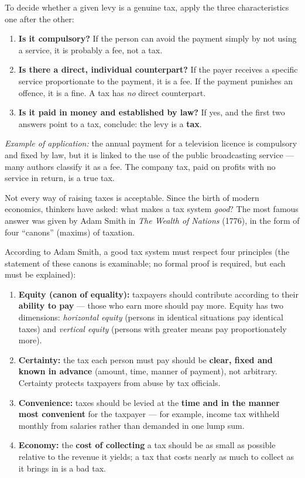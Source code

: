 \documentclass[11pt]{article}
\newcounter{popsec}
\newcounter{popsub}
\newcommand{\courssub}[1]{%
  \stepcounter{popsub}%
  \par\vspace{9pt}\noindent{\popxbold\fontsize{11.5}{13}\selectfont\color{popink}{\color{poporange}\thepopsec.\thepopsub}\hspace{6pt}#1}\par\nopagebreak\vspace{4pt}
}
\begin{document}
\begin{methode}
To decide whether a given levy is a genuine tax, apply the three characteristics one after the other:
\begin{enumerate}
\item \textbf{Is it compulsory?} If the person can avoid the payment simply by not using a service, it is probably a fee, not a tax.
\item \textbf{Is there a direct, individual counterpart?} If the payer receives a specific service proportionate to the payment, it is a fee. If the payment punishes an offence, it is a fine. A tax has \emph{no} direct counterpart.
\item \textbf{Is it paid in money and established by law?} If yes, and the first two answers point to a tax, conclude: the levy is a \textbf{tax}.
\end{enumerate}
\emph{Example of application:} the annual payment for a television licence is compulsory and fixed by law, but it is linked to the use of the public broadcasting service — many authors classify it as a fee. The company tax, paid on profits with no service in return, is a true tax.
\end{methode}

\courssub{The Principles of a Good Tax System}

Not every way of raising taxes is acceptable. Since the birth of modern economics, thinkers have asked: what makes a tax system \emph{good}? The most famous answer was given by Adam Smith in \emph{The Wealth of Nations} (1776), in the form of four ``canons'' (maxims) of taxation.

\begin{propriete}
According to Adam Smith, a good tax system must respect four principles (the statement of these canons is examinable; no formal proof is required, but each must be explained):
\begin{enumerate}
\item \textbf{Equity (canon of equality):} taxpayers should contribute according to their \textbf{ability to pay} — those who earn more should pay more. Equity has two dimensions: \emph{horizontal equity} (persons in identical situations pay identical taxes) and \emph{vertical equity} (persons with greater means pay proportionately more).
\item \textbf{Certainty:} the tax each person must pay should be \textbf{clear, fixed and known in advance} (amount, time, manner of payment), not arbitrary. Certainty protects taxpayers from abuse by tax officials.
\item \textbf{Convenience:} taxes should be levied at the \textbf{time and in the manner most convenient} for the taxpayer — for example, income tax withheld monthly from salaries rather than demanded in one lump sum.
\item \textbf{Economy:} the \textbf{cost of collecting} a tax should be as small as possible relative to the revenue it yields; a tax that costs nearly as much to collect as it brings in is a bad tax.
\end{enumerate}
\end{propriete}
\end{document}
